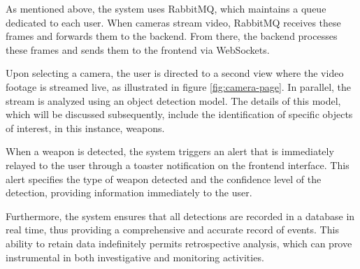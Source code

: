 As mentioned above, the system uses RabbitMQ, which maintains a queue dedicated to each user. When cameras stream video, 
RabbitMQ receives these frames and forwards them to the backend. 
From there, the backend processes these 
frames and sends them to the frontend via WebSockets.

Upon selecting a camera, the user is directed to a second view where the video footage is streamed live, as illustrated in
 figure \ref{fig:camera-page}. 
In parallel, the stream is analyzed using an object detection model. The details of this model, which will be discussed 
subsequently, include the identification of specific objects of interest, in this instance, weapons.

When a weapon is detected, the system triggers an alert that is immediately relayed to the user through a toaster 
notification on the frontend interface. This alert specifies the type of weapon detected and the confidence level 
of the detection, providing information immediately to the user. 

Furthermore, the system ensures that all detections are recorded in a database in real time, thus providing a 
comprehensive and accurate record of events.
This ability to retain data indefinitely permits retrospective analysis, which can prove 
instrumental in both investigative and monitoring activities.

